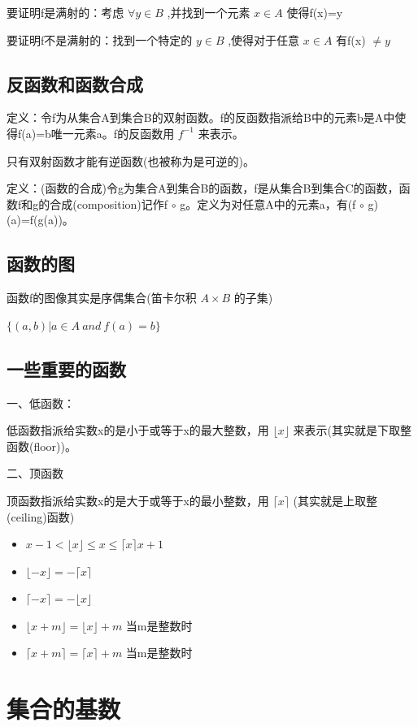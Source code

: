 \documentclass[12pt,a4paper,oneside]{ctexart}
\begin{document}
要证明f是满射的：考虑 \(\forall y\in B\) ,并找到一个元素 \(x\in A\) 使得f(x)=y

要证明f不是满射的：找到一个特定的 \(y\in B\) ,使得对于任意 \(x\in A\) 有f(x) \(\neq y\)

\subsection*{反函数和函数合成}

定义：令f为从集合A到集合B的双射函数。f的反函数指派给B中的元素b是A中使得f(a)=b唯一元素a。f的反函数用 \(f^{-1}\) 来表示。

只有双射函数才能有逆函数(也被称为是可逆的)。

定义：(函数的合成)令g为集合A到集合B的函数，f是从集合B到集合C的函数，函数f和g的合成(composition)记作f \(\circ\) g。定义为对任意A中的元素a，有(f \(\circ\) g)(a)=f(g(a))。

\subsection*{函数的图}

函数f的图像其实是序偶集合(笛卡尔积 \(A\times B\) 的子集)

\(\{(a,b)|a\in A\ and\ f(a)=b\}\)

\subsection*{一些重要的函数}

一、低函数：

低函数指派给实数x的是小于或等于x的最大整数，用 \(\lfloor x\rfloor\) 来表示(其实就是下取整函数(floor))。

二、顶函数

顶函数指派给实数x的是大于或等于x的最小整数，用 \(\lceil x\rceil\) (其实就是上取整(ceiling)函数)

\begin{itemize}
\item
  \(x-1<\lfloor x\rfloor\leqslant x\leqslant\lceil x\rceil x+1\)
\item
  \(\lfloor -x\rfloor=-\lceil x\rceil\)
\item
  \(\lceil -x\rceil=-\lfloor x\rfloor\)
\item
  \(\lfloor x+m\rfloor=\lfloor x\rfloor+m\) 当m是整数时
\item
  \(\lceil x+m\rceil=\lceil x\rceil+m\) 当m是整数时
\end{itemize}

\section*{集合的基数}
\end{document}
